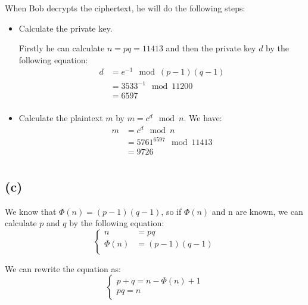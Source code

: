 \documentclass[a4paper,12pt]{article}
\begin{document}
When Bob decrypts the ciphertext, he will do the following steps:
\begin{itemize}
    \item Calculate the private key.

          Firstly he can calculate $n = pq = 11413$ and then the private key $d$ by the following equation:
          \begin{equation}
              \begin{aligned}
                  d & = e^{-1} \mod (p - 1)(q - 1) \\
                    & = 3533^{-1} \mod 11200       \\
                    & = 6597                       \\
              \end{aligned}
          \end{equation}

    \item Calculate the plaintext $m$ by $m = c^d \mod n$. We have:
          \begin{equation}
              \begin{aligned}
                  m & = c^d \mod n             \\
                    & = 5761^{6597} \mod 11413 \\
                    & = 9726                   \\
              \end{aligned}
          \end{equation}
\end{itemize}

\subsection{(c)}
We know that $\Phi(n) = (p - 1)(q - 1)$, so if $\Phi(n)$ and n are known, we can calculate $p$ and $q$ by the following equation:
\begin{equation}
    \begin{cases}
        n       & = pq             \\
        \Phi(n) & = (p - 1)(q - 1) \\
    \end{cases}
\end{equation}

We can rewrite the equation as:
\begin{equation}
    \begin{cases}
        p + q = n - \Phi(n) + 1 \\
        pq = n                  \\
    \end{cases}
\end{equation}
\end{document}
